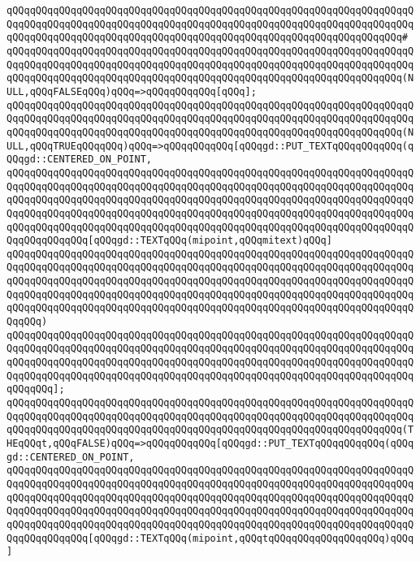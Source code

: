 \verb|qQQqqQQqqQQqqQQqqQQqqQQqqQQqqQQqqQQqqQQqqQQqqQQqqQQqqQQqqQQqqQQqqQQqqQQqqQQqqQQqqQQqqQQqqQQqqQQqqQQqqQQqqQQqqQQqqQQqqQQqqQQqqQQqqQQqqQQqqQQqqQQqqQQqqQQqqQQqqQQqqQQqqQQqqQQqqQQqqQQqqQQqqQQqqQQqqQQqqQQqqQQqqQQq#|\newline
\verb|qQQqqQQqqQQqqQQqqQQqqQQqqQQqqQQqqQQqqQQqqQQqqQQqqQQqqQQqqQQqqQQqqQQqqQQqqQQqqQQqqQQqqQQqqQQqqQQqqQQqqQQqqQQqqQQqqQQqqQQqqQQqqQQqqQQqqQQqqQQqqQQqqQQqqQQqqQQqqQQqqQQqqQQqqQQqqQQqqQQqqQQqqQQqqQQqqQQqqQQqqQQqqQQq(NULL,qQQqFALSEqQQq)qQQq=>qQQqqQQqqQQq[qQQq];|\newline
\newline
\verb|qQQqqQQqqQQqqQQqqQQqqQQqqQQqqQQqqQQqqQQqqQQqqQQqqQQqqQQqqQQqqQQqqQQqqQQqqQQqqQQqqQQqqQQqqQQqqQQqqQQqqQQqqQQqqQQqqQQqqQQqqQQqqQQqqQQqqQQqqQQqqQQqqQQqqQQqqQQqqQQqqQQqqQQqqQQqqQQqqQQqqQQqqQQqqQQqqQQqqQQqqQQqqQQq(NULL,qQQqTRUEqQQqqQQq)qQQq=>qQQqqQQqqQQq[qQQqgd::PUT_TEXTqQQqqQQqqQQq(qQQqgd::CENTERED_ON_POINT,|\newline
\verb|qQQqqQQqqQQqqQQqqQQqqQQqqQQqqQQqqQQqqQQqqQQqqQQqqQQqqQQqqQQqqQQqqQQqqQQqqQQqqQQqqQQqqQQqqQQqqQQqqQQqqQQqqQQqqQQqqQQqqQQqqQQqqQQqqQQqqQQqqQQqqQQqqQQqqQQqqQQqqQQqqQQqqQQqqQQqqQQqqQQqqQQqqQQqqQQqqQQqqQQqqQQqqQQqqQQqqQQqqQQqqQQqqQQqqQQqqQQqqQQqqQQqqQQqqQQqqQQqqQQqqQQqqQQqqQQqqQQqqQQqqQQqqQQqqQQqqQQqqQQqqQQqqQQqqQQqqQQqqQQqqQQqqQQqqQQqqQQqqQQqqQQqqQQqqQQqqQQqqQQqqQQq[qQQqgd::TEXTqQQq(mipoint,qQQqmitext)qQQq]|\newline
\verb|qQQqqQQqqQQqqQQqqQQqqQQqqQQqqQQqqQQqqQQqqQQqqQQqqQQqqQQqqQQqqQQqqQQqqQQqqQQqqQQqqQQqqQQqqQQqqQQqqQQqqQQqqQQqqQQqqQQqqQQqqQQqqQQqqQQqqQQqqQQqqQQqqQQqqQQqqQQqqQQqqQQqqQQqqQQqqQQqqQQqqQQqqQQqqQQqqQQqqQQqqQQqqQQqqQQqqQQqqQQqqQQqqQQqqQQqqQQqqQQqqQQqqQQqqQQqqQQqqQQqqQQqqQQqqQQqqQQqqQQqqQQqqQQqqQQqqQQqqQQqqQQqqQQqqQQqqQQqqQQqqQQqqQQqqQQqqQQqqQQqqQQqqQQqqQQqqQQq)|\newline
\verb|qQQqqQQqqQQqqQQqqQQqqQQqqQQqqQQqqQQqqQQqqQQqqQQqqQQqqQQqqQQqqQQqqQQqqQQqqQQqqQQqqQQqqQQqqQQqqQQqqQQqqQQqqQQqqQQqqQQqqQQqqQQqqQQqqQQqqQQqqQQqqQQqqQQqqQQqqQQqqQQqqQQqqQQqqQQqqQQqqQQqqQQqqQQqqQQqqQQqqQQqqQQqqQQqqQQqqQQqqQQqqQQqqQQqqQQqqQQqqQQqqQQqqQQqqQQqqQQqqQQqqQQqqQQqqQQqqQQqqQQqqQQqqQQq];|\newline
\verb|qQQqqQQqqQQqqQQqqQQqqQQqqQQqqQQqqQQqqQQqqQQqqQQqqQQqqQQqqQQqqQQqqQQqqQQqqQQqqQQqqQQqqQQqqQQqqQQqqQQqqQQqqQQqqQQqqQQqqQQqqQQqqQQqqQQqqQQqqQQqqQQqqQQqqQQqqQQqqQQqqQQqqQQqqQQqqQQqqQQqqQQqqQQqqQQqqQQqqQQqqQQqqQQq(THEqQQqt,qQQqFALSE)qQQq=>qQQqqQQqqQQq[qQQqgd::PUT_TEXTqQQqqQQqqQQq(qQQqgd::CENTERED_ON_POINT,|\newline
\verb|qQQqqQQqqQQqqQQqqQQqqQQqqQQqqQQqqQQqqQQqqQQqqQQqqQQqqQQqqQQqqQQqqQQqqQQqqQQqqQQqqQQqqQQqqQQqqQQqqQQqqQQqqQQqqQQqqQQqqQQqqQQqqQQqqQQqqQQqqQQqqQQqqQQqqQQqqQQqqQQqqQQqqQQqqQQqqQQqqQQqqQQqqQQqqQQqqQQqqQQqqQQqqQQqqQQqqQQqqQQqqQQqqQQqqQQqqQQqqQQqqQQqqQQqqQQqqQQqqQQqqQQqqQQqqQQqqQQqqQQqqQQqqQQqqQQqqQQqqQQqqQQqqQQqqQQqqQQqqQQqqQQqqQQqqQQqqQQqqQQqqQQqqQQqqQQqqQQqqQQqqQQq[qQQqgd::TEXTqQQq(mipoint,qQQqtqQQqqQQqqQQqqQQqqQQq)qQQq]|\newline
